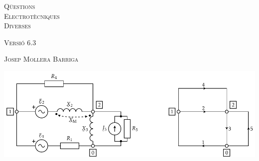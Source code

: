 \begin{titlepage}

   \parbox{18cm}{\fontsize{60pt}{60pt}\selectfont\color{NavyBlue}\scshape%
                 Q\"{u}estions\\[30pt] Electrot\`{e}cniques\\[30pt] Diverses}

   \vspace*{1.8cm}
   {\fontsize{30pt}{30pt}\selectfont\textsc{Versi\'{o} 6.3}}

   \vspace*{2cm}
   {\fontsize{40pt}{40pt}\selectfont\textsc{Josep Mollera Barriga}}

   \vspace*{3cm}
   \includegraphics{Imatges/Cap-ResXarxElec-Circuit-Graf.pdf}

\end{titlepage}
